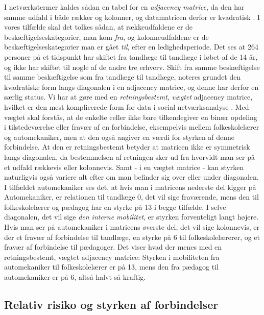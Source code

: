 I netværkstermer kaldes sådan en tabel for en \emph{adjacency matrice}, da den har samme udfald i både rækker og kolonner, og datamatricen derfor er kvadratisk \parencite[55]{Scott2000}. I vores tilfælde skal det tolkes sådan, at rækkeudfaldene er de beskæftigelseskategorier, man kom \emph{fra}, og kolonneudfaldene er de beskæftigelseskategorier man er gået \emph{til}, efter en ledighedsperiode. Det ses at 264 personer på et tidspunkt har skiftet fra tandlæge til tandlæge i løbet af de 14 år, og ikke har skiftet til nogle af de andre tre erhverv. Skift fra samme beskæftigelse til samme beskæftigelse som fra tandlæge til tandlæge, noteres grundet den kvadratiske form langs diagonalen i en adjacency matrice, og denne har derfor en særlig status. Vi har at gøre med en \emph{retningsbestemt}, \emph{vægtet} adjacency matrice, hvilket er den mest komplicerede form for  data i social netværksanalyse \parencite[61]{Scott2000}. Med vægtet skal forstås, at de enkelte celler ikke bare tilkendegiver en binær opdeling i tilstedeværelse eller fravær af en forbindelse, eksempelvis mellem folkeskolelærer og automekaniker, men at den også angiver en værdi for styrken af denne forbindelse. At den er retningsbestemt betyder at matricen ikke er symmetrisk langs diagonalen, da bestemmelsen af retningen sker ud fra hvorvidt man ser på et udfald rækkevis eller kolonnevis. Samt - i en vægtet matrice - kan styrken naturligvis også variere alt efter om man befinder sig over eller under diagonalen. I tilfældet automekaniker ses det, at hvis man i matricens nederste del kigger på Automekaniker, er relationen til tandlæge 0, det vil sige fraværende, mens den til folkeskolelærer og pædagog har en styrke på 13 i begge tilfælde. I selve diagonalen, det  vil sige \emph{den interne mobilitet}, er styrken forventeligt langt højere. Hvis man ser på automekaniker i matricens øverste del, det vil sige kolonnevis, er der et fravær af forbindelse til tandlæge, en styrke på 6 til folkeskolelærerer, og et fravær af forbindelse til pædagoger. Det viser hvad der menes med en retningsbestemt, vægtet adjacency matrice: Styrken i mobiliteten fra automekaniker til folkeskolelærer er på 13, mens den fra pædagog til automekaniker er på 6, altså halvt så kraftig.



\subsection{Relativ risiko og styrken af forbindelser \label{metode_relativrisiko}}

